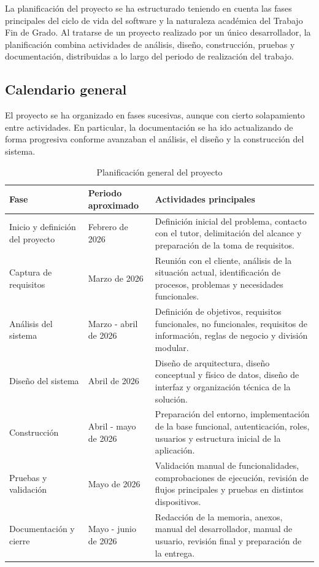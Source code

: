 La planificación del proyecto se ha estructurado teniendo en cuenta las fases principales del ciclo de vida del software y la naturaleza académica del Trabajo Fin de Grado. Al tratarse de un proyecto realizado por un único desarrollador, la planificación combina actividades de análisis, diseño, construcción, pruebas y documentación, distribuidas a lo largo del periodo de realización del trabajo.

\subsection{Calendario general}

El proyecto se ha organizado en fases sucesivas, aunque con cierto solapamiento entre actividades. En particular, la documentación se ha ido actualizando de forma progresiva conforme avanzaban el análisis, el diseño y la construcción del sistema.

\begin{table}[htbp]
    \centering
    \small
    \caption{Planificación general del proyecto}
    \label{tab:project-plan-schedule}
    \begin{tabularx}{\textwidth}{|L{3.5cm}|L{2.8cm}|Y|}
        \hline
        \textbf{Fase} & \textbf{Periodo aproximado} & \textbf{Actividades principales} \\
        \hline
        Inicio y definición del proyecto & Febrero de 2026 & Definición inicial del problema, contacto con el tutor, delimitación del alcance y preparación de la toma de requisitos. \\
        \hline
        Captura de requisitos & Marzo de 2026 & Reunión con el cliente, análisis de la situación actual, identificación de procesos, problemas y necesidades funcionales. \\
        \hline
        Análisis del sistema & Marzo - abril de 2026 & Definición de objetivos, requisitos funcionales, no funcionales, requisitos de información, reglas de negocio y división modular. \\
        \hline
        Diseño del sistema & Abril de 2026 & Diseño de arquitectura, diseño conceptual y físico de datos, diseño de interfaz y organización técnica de la solución. \\
        \hline
        Construcción & Abril - mayo de 2026 & Preparación del entorno, implementación de la base funcional, autenticación, roles, usuarios y estructura inicial de la aplicación. \\
        \hline
        Pruebas y validación & Mayo de 2026 & Validación manual de funcionalidades, comprobaciones de ejecución, revisión de flujos principales y pruebas en distintos dispositivos. \\
        \hline
        Documentación y cierre & Mayo - junio de 2026 & Redacción de la memoria, anexos, manual del desarrollador, manual de usuario, revisión final y preparación de la entrega. \\
        \hline
    \end{tabularx}
\end{table}
